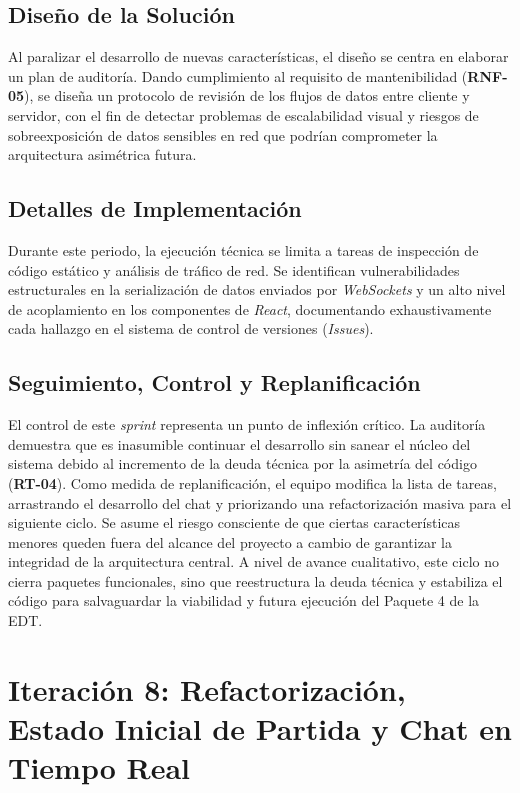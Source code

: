 \section{Diseño de la Solución}
Al paralizar el desarrollo de nuevas características, el diseño se centra en elaborar un plan de auditoría. Dando cumplimiento al requisito de mantenibilidad (\textbf{RNF-05}), se diseña un protocolo de revisión de los flujos de datos entre cliente y servidor, con el fin de detectar problemas de escalabilidad visual y riesgos de sobreexposición de datos sensibles en red que podrían comprometer la arquitectura asimétrica futura.

\section{Detalles de Implementación}
Durante este periodo, la ejecución técnica se limita a tareas de inspección de código estático y análisis de tráfico de red. Se identifican vulnerabilidades estructurales en la serialización de datos enviados por \textit{WebSockets} y un alto nivel de acoplamiento en los componentes de \textit{React}, documentando exhaustivamente cada hallazgo en el sistema de control de versiones (\textit{Issues}).

\section{Seguimiento, Control y Replanificación}
El control de este \textit{sprint} representa un punto de inflexión crítico. La auditoría demuestra que es inasumible continuar el desarrollo sin sanear el núcleo del sistema debido al incremento de la deuda técnica por la asimetría del código (\textbf{RT-04}). Como medida de replanificación, el equipo modifica la lista de tareas, arrastrando el desarrollo del chat y priorizando una refactorización masiva para el siguiente ciclo. Se asume el riesgo consciente de que ciertas características menores queden fuera del alcance del proyecto a cambio de garantizar la integridad de la arquitectura central. A nivel de avance cualitativo, este ciclo no cierra paquetes funcionales, sino que reestructura la deuda técnica y estabiliza el código para salvaguardar la viabilidad y futura ejecución del Paquete 4 de la EDT.


\chapter[Iteración 8: Refactorización y Chat en Tiempo Real]{Iteración 8: Refactorización, Estado Inicial de Partida y Chat en Tiempo Real}

